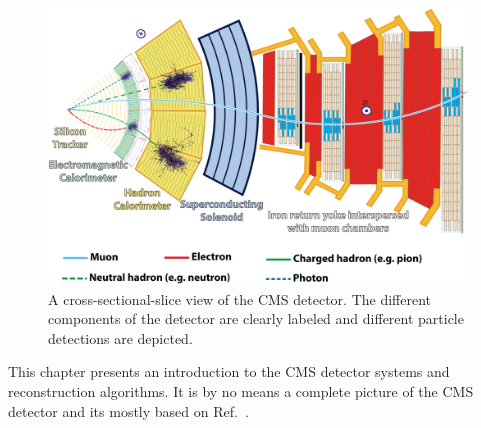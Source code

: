 \begin{figure}
 \centering
\includegraphics[width=0.99\textwidth]{CMS_DetectorFigures/CMSslice.png}
 \caption{A cross-sectional-slice view of the CMS detector. The
   different components of the detector are clearly labeled and
   different particle detections are depicted.\label{fig:cmsSlice}}
\end{figure}

This chapter presents an introduction to the CMS detector systems and
reconstruction algorithms. It is by no means a complete picture of the
CMS detector and its mostly based on Ref.~\cite{Chatrchyan:2008zzk}.

